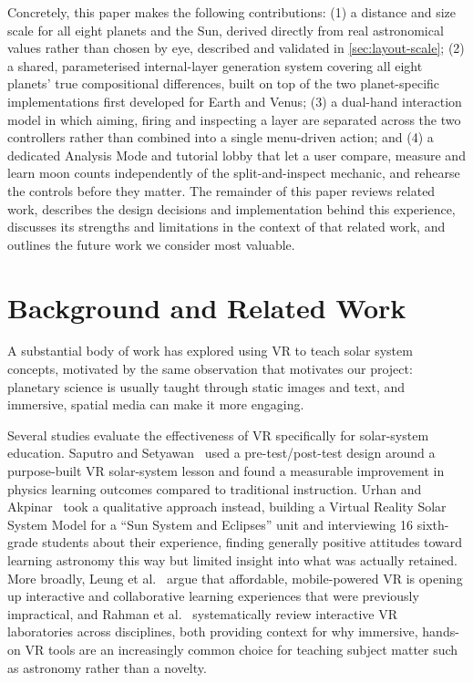 \documentclass[journal]{vgtc}
\begin{document}
Concretely, this paper makes the following contributions: (1) a distance and size scale for all eight planets and the Sun, derived directly from real astronomical values rather than chosen by eye, described and validated in \cref{sec:layout-scale}; (2) a shared, parameterised internal-layer generation system covering all eight planets' true compositional differences, built on top of the two planet-specific implementations first developed for Earth and Venus; (3) a dual-hand interaction model in which aiming, firing and inspecting a layer are separated across the two controllers rather than combined into a single menu-driven action; and (4) a dedicated Analysis Mode and tutorial lobby that let a user compare, measure and learn moon counts independently of the split-and-inspect mechanic, and rehearse the controls before they matter. The remainder of this paper reviews related work, describes the design decisions and implementation behind this experience, discusses its strengths and limitations in the context of that related work, and outlines the future work we consider most valuable.

\section{Background and Related Work}
A substantial body of work has explored using VR to teach solar system concepts, motivated by the same observation that motivates our project: planetary science is usually taught through static images and text, and immersive, spatial media can make it more engaging.

Several studies evaluate the effectiveness of VR specifically for solar-system education. Saputro and Setyawan~\cite{saputro2020} used a pre-test/post-test design around a purpose-built VR solar-system lesson and found a measurable improvement in physics learning outcomes compared to traditional instruction. Urhan and Akpinar~\cite{urhan2024} took a qualitative approach instead, building a Virtual Reality Solar System Model for a ``Sun System and Eclipses'' unit and interviewing 16 sixth-grade students about their experience, finding generally positive attitudes toward learning astronomy this way but limited insight into what was actually retained. More broadly, Leung et al.~\cite{leung2019} argue that affordable, mobile-powered VR is opening up interactive and collaborative learning experiences that were previously impractical, and Rahman et al.~\cite{rahman2022} systematically review interactive VR laboratories across disciplines, both providing context for why immersive, hands-on VR tools are an increasingly common choice for teaching subject matter such as astronomy rather than a novelty.
\end{document}
